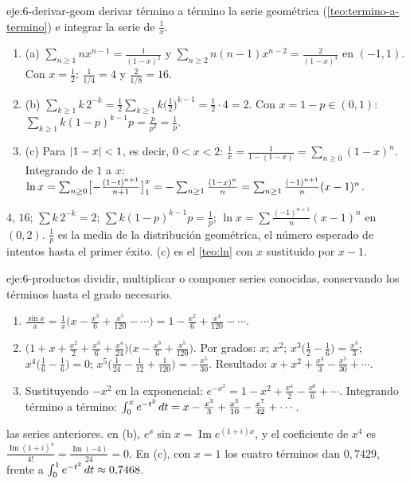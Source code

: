 \begin{solucion}{eje:6-derivar-geom}
\planteamiento derivar término a término la serie geométrica (\cref{teo:termino-a-termino}) e integrar la serie de $\frac1x$.
\pasos
\begin{enumerate}[label=\arabic*.]
  \item (a) $\sum_{n\ge1}nx^{n-1}=\frac{1}{(1-x)^{2}}$ y $\sum_{n\ge2}n(n-1)x^{n-2}=\frac{2}{(1-x)^{3}}$ en $(-1,1)$. Con $x=\frac12$: $\frac{1}{1/4}=4$ y $\frac{2}{1/8}=16$.
  \item (b) $\sum_{k\ge1}k\,2^{-k}=\frac12\sum_{k\ge1}k\bigl(\frac12\bigr)^{k-1}=\frac12\cdot4=2$. Con $x=1-p\in(0,1)$: $\sum_{k\ge1}k(1-p)^{k-1}p=\frac{p}{p^{2}}=\frac1p$.
  \item (c) Para $\lvert1-x\rvert<1$, es decir, $0<x<2$: $\frac1x=\frac{1}{1-(1-x)}=\sum_{n\ge0}(1-x)^{n}$. Integrando de $1$ a $x$: $\ln x=\sum_{n\ge0}\bigl[-\frac{(1-t)^{n+1}}{n+1}\bigr]_{1}^{x}=-\sum_{n\ge1}\frac{(1-x)^{n}}{n}=\sum_{n\ge1}\frac{(-1)^{n+1}}{n}(x-1)^{n}$.
\end{enumerate}
\resultado $4$, $16$; $\sum k\,2^{-k}=2$; $\sum k(1-p)^{k-1}p=\frac1p$; $\ln x=\sum\frac{(-1)^{n+1}}{n}(x-1)^{n}$ en $(0,2)$.
\comprobacion $\frac1p$ es la media de la distribución geométrica, el número esperado de intentos hasta el primer éxito. (c) es el \cref{teo:ln} con $x$ sustituido por $x-1$.
\end{solucion}

\begin{solucion}{eje:6-productos}
\planteamiento dividir, multiplicar o componer series conocidas, conservando los términos hasta el grado necesario.
\pasos
\begin{enumerate}[label=(\alph*)]
  \item $\frac{\sin x}{x}=\frac1x\bigl(x-\frac{x^{3}}{6}+\frac{x^{5}}{120}-\cdots\bigr)=1-\frac{x^{2}}{6}+\frac{x^{4}}{120}-\cdots$.
  \item $\bigl(1+x+\frac{x^{2}}{2}+\frac{x^{3}}{6}+\frac{x^{4}}{24}\bigr)\bigl(x-\frac{x^{3}}{6}+\frac{x^{5}}{120}\bigr)$. Por grados: $x$; $x^{2}$; $x^{3}\bigl(\frac12-\frac16\bigr)=\frac{x^{3}}{3}$; $x^{4}\bigl(\frac16-\frac16\bigr)=0$; $x^{5}\bigl(\frac{1}{24}-\frac{1}{12}+\frac{1}{120}\bigr)=-\frac{x^{5}}{30}$. Resultado: $x+x^{2}+\frac{x^{3}}{3}-\frac{x^{5}}{30}+\cdots$.
  \item Sustituyendo $-x^{2}$ en la exponencial: $e^{-x^{2}}=1-x^{2}+\frac{x^{4}}{2}-\frac{x^{6}}{6}+\cdots$. Integrando término a término: $\int_0^{x}e^{-t^{2}}\mathop{}\!d t=x-\frac{x^{3}}{3}+\frac{x^{5}}{10}-\frac{x^{7}}{42}+\cdots$.
\end{enumerate}
\resultado las series anteriores.
\comprobacion en (b), $e^{x}\sin x=\operatorname{Im}e^{(1+i)x}$, y el coeficiente de $x^{4}$ es $\frac{\operatorname{Im}(1+i)^{4}}{4!}=\frac{\operatorname{Im}(-4)}{24}=0$. En (c), con $x=1$ los cuatro términos dan $0{,}7429$, frente a $\int_0^{1}e^{-t^{2}}\mathop{}\!d t\approx0{,}7468$.
\end{solucion}

